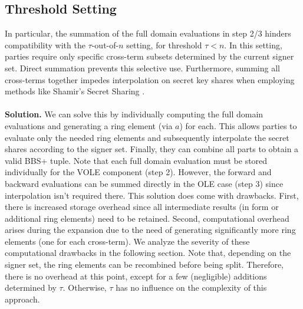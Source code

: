 \subsection{Threshold Setting}
\label{subsec:tauoutofnSetting}
In particular, the summation of the full domain evaluations in step 2/3 hinders compatibility with the $\tau$-out-of-$n$ setting, for threshold $\tau < n$. In this setting, parties require only specific cross-term subsets determined by the current signer set. Direct summation prevents this selective use. Furthermore, summing all cross-terms together impedes interpolation on secret key shares when employing methods like Shamir's Secret Sharing \cite{shamir1979share}.  
\\\\
\textbf{Solution.} We can solve this by individually computing the full domain evaluations and generating a ring element (via $a$) for each. This allows parties to evaluate only the needed ring elements and subsequently interpolate the secret shares according to the signer set. Finally, they can combine all parts to obtain a valid BBS+ tuple. Note that each full domain evaluation must be stored individually for the VOLE component (step 2). However, the forward and backward evaluations can be summed directly in the OLE case (step 3) since interpolation isn't required there. This solution does come with drawbacks. First, there is increased storage overhead since all intermediate results (in form or additional ring elements) need to be retained. Second, computational overhead arises during the expansion due to the need of generating significantly more ring elements (one for each cross-term). We analyze the severity of these computational drawbacks in the following section. Note that, depending on the signer set, the ring elements can be recombined before being split. Therefore, there is no overhead at this point, except for a few (negligible) additions determined by $\tau$. Otherwise, $\tau$ has no influence on the complexity of this approach.

